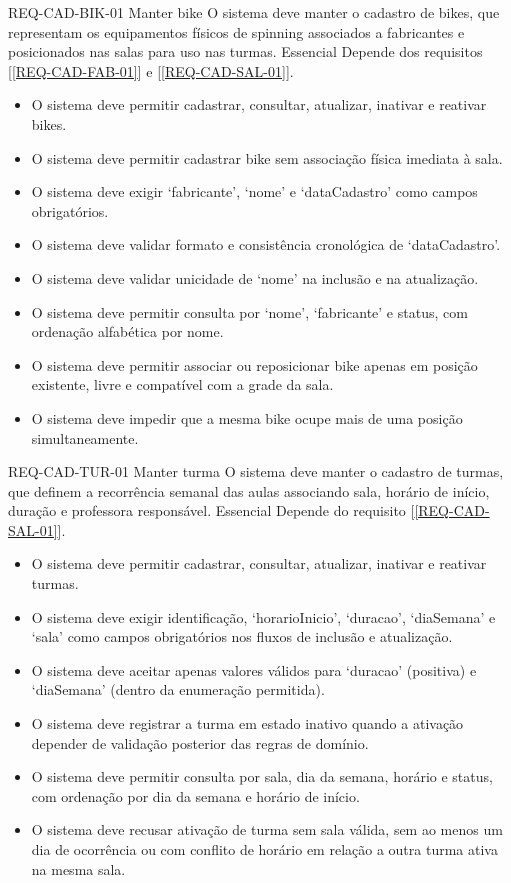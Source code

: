 
\reqfunccad
{REQ-CAD-BIK-01 Manter bike}
{O sistema deve manter o cadastro de bikes, que representam os equipamentos físicos de spinning associados a fabricantes e posicionados nas salas para uso nas turmas.}
{Essencial}
{Depende dos requisitos [\ref{REQ-CAD-FAB-01}] e [\ref{REQ-CAD-SAL-01}].}
{\begin{itemize}[leftmargin=0.6cm]
    \item O sistema deve permitir cadastrar, consultar, atualizar, inativar e reativar bikes.
    \item O sistema deve permitir cadastrar bike sem associação física imediata à sala.
    \item O sistema deve exigir `fabricante', `nome' e `dataCadastro' como campos obrigatórios.
    \item O sistema deve validar formato e consistência cronológica de `dataCadastro'.
    \item O sistema deve validar unicidade de `nome' na inclusão e na atualização.
    \item O sistema deve permitir consulta por `nome', `fabricante' e status, com ordenação alfabética por nome.
    \item O sistema deve permitir associar ou reposicionar bike apenas em posição existente, livre e compatível com a grade da sala.
    \item O sistema deve impedir que a mesma bike ocupe mais de uma posição simultaneamente.
\end{itemize}}


\reqfunccad
{REQ-CAD-TUR-01 Manter turma}
{O sistema deve manter o cadastro de turmas, que definem a recorrência semanal das aulas associando sala, horário de início, duração e professora responsável.}
{Essencial}
{Depende do requisito [\ref{REQ-CAD-SAL-01}].}
{\begin{itemize}[leftmargin=0.6cm]
    \item O sistema deve permitir cadastrar, consultar, atualizar, inativar e reativar turmas.
    \item O sistema deve exigir identificação, `horarioInicio', `duracao', `diaSemana' e `sala' como campos obrigatórios nos fluxos de inclusão e atualização.
    \item O sistema deve aceitar apenas valores válidos para `duracao' (positiva) e `diaSemana' (dentro da enumeração permitida).
    \item O sistema deve registrar a turma em estado inativo quando a ativação depender de validação posterior das regras de domínio.
    \item O sistema deve permitir consulta por sala, dia da semana, horário e status, com ordenação por dia da semana e horário de início.
    \item O sistema deve recusar ativação de turma sem sala válida, sem ao menos um dia de ocorrência ou com conflito de horário em relação a outra turma ativa na mesma sala.
\end{itemize}}

